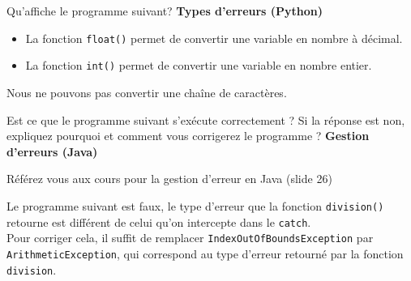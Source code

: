  \begin{Exercice}[5 minutes] Qu'affiche le programme suivant? \textbf{Types d'erreurs (Python)}\\
    
    
     \begin{conseil}
        \begin{itemize}
            \item La fonction \lstinline{float()} permet de convertir une variable en nombre à décimal.
            \item La fonction \lstinline{int()} permet de convertir une variable en nombre entier.
        \end{itemize}  
    \end{conseil}

     \begin{solution}
        Nous ne pouvons pas convertir une chaîne de caractères.
     \end{solution}

\end{Exercice}
 
\begin{Exercice}[5 minutes] Est ce que le programme suivant s'exécute correctement ? Si la réponse est non, expliquez pourquoi et comment vous corrigerez le programme ? \textbf{Gestion d'erreurs (Java)}\\
    

    
     \begin{conseil}
        Référez vous aux cours pour la gestion d'erreur en Java (slide 26)         
     \end{conseil}
     \begin{solution}
     Le programme suivant est faux, le type d'erreur que la fonction \lstinline{division()} retourne est différent de celui qu'on intercepte dans le \lstinline{catch}. \\
     Pour corriger cela, il suffit de remplacer \lstinline{IndexOutOfBoundsException} par \lstinline{ArithmeticException}, qui correspond au type d'erreur retourné par la fonction \lstinline{division}.
     \end{solution}   
 \end{Exercice}


